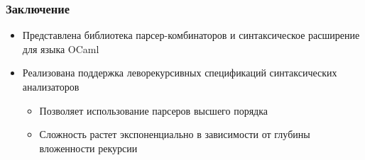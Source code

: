 \documentclass{beamer}
\begin{document}
\begin{frame}[fragile]
  \transwipe[direction=90]
  \frametitle{Заключение}
  \begin{itemize} 
    \item Представлена библиотека парсер-комбинаторов и синтаксическое расширение для языка OCaml
    \item Реализована поддержка леворекурсивных спецификаций синтаксических анализаторов
    \begin{itemize}
      \item Позволяет использование парсеров высшего порядка
      \item Сложность растет экспоненциально в зависимости от глубины вложенности рекурсии
    \end{itemize}
  \end{itemize}
\end{frame}
\end{document}
